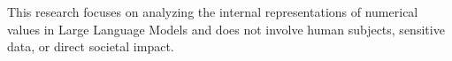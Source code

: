 This research focuses on analyzing the internal representations of numerical values in Large Language Models and does not involve human subjects, sensitive data, or direct societal impact.